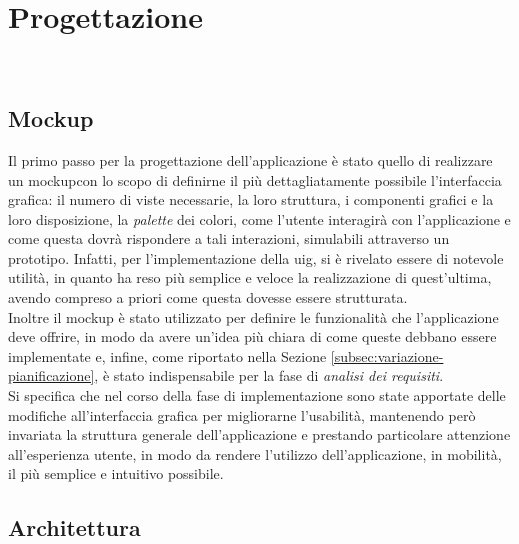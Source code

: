 \chapter{Progettazione}
\label{cap:progettazione}

\\

\section{Mockup}
\label{sec:mockup}

Il primo passo per la progettazione dell'applicazione è stato quello di realizzare un \gls{mockup}\glsoccur con lo scopo di definirne il più dettagliatamente possibile l'interfaccia grafica: il numero di viste necessarie, la loro struttura, i componenti grafici e la loro disposizione, la \emph{palette} dei colori, come l'utente interagirà con l'applicazione e come questa dovrà rispondere a tali interazioni, simulabili attraverso un prototipo. Infatti, per l'implementazione della \gls{uig}\glsoccur, si è rivelato essere di notevole utilità, in quanto ha reso più semplice e veloce la realizzazione di quest'ultima, avendo compreso a priori come questa dovesse essere strutturata.\\
Inoltre il \gls{mockup} è stato utilizzato per definire le funzionalità che l'applicazione deve offrire, in modo da avere un'idea più chiara di come queste debbano essere implementate e, infine, come riportato nella Sezione \ref{subsec:variazione-pianificazione}, è stato indispensabile per la fase di \emph{analisi dei requisiti}.\\ 
Si specifica che nel corso della fase di implementazione sono state apportate delle modifiche all'interfaccia grafica per migliorarne l'usabilità, mantenendo però invariata la struttura generale dell'applicazione e prestando particolare attenzione all'esperienza utente, in modo da rendere l'utilizzo dell'applicazione, in mobilità, il più semplice e intuitivo possibile.

\section{Architettura}
\label{sec:architettura}

